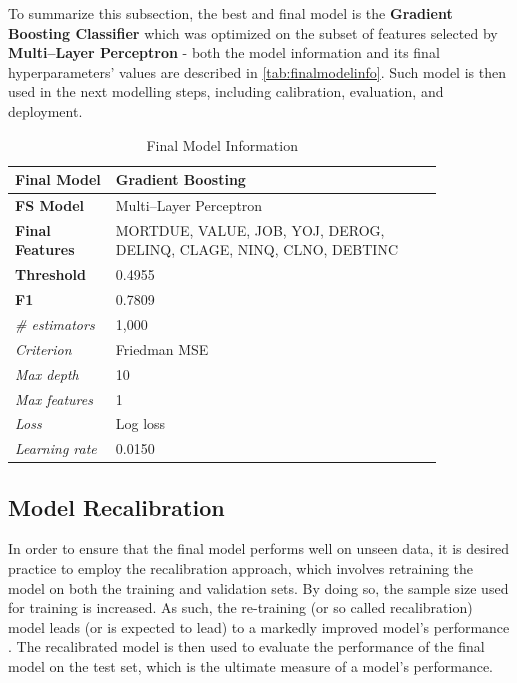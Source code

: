 \newpage
To summarize this subsection, the best and final model is the \textbf{Gradient Boosting Classifier} which was optimized on the subset of features selected by \textbf{Multi--Layer Perceptron} - both the model information and its final hyperparameters' values are described in \autoref{tab:finalmodelinfo}. Such model is then used in the next modelling steps, including calibration, evaluation, and deployment.
\begin{table}[H]
    \small
    \setlength{\tabcolsep}{8pt}
    \renewcommand{\arraystretch}{1.3}
    \centering
    \caption{Final Model Information}\label{tab:finalmodelinfo}
    \begin{tabular}{>{\raggedleft\arraybackslash}p{0.20\linewidth}|p{0.65\linewidth}}
    \toprule
    \midrule
    \textbf{Final Model} & Gradient Boosting \\
    \midrule
    \textbf{FS Model} & Multi--Layer Perceptron \\
    \midrule
    \textbf{Final Features} &
    MORTDUE, VALUE, JOB, YOJ, DEROG, DELINQ, CLAGE, NINQ, CLNO, DEBTINC \\
    \midrule
    \textbf{Threshold} & 0.4955 \\
    \midrule
    \textbf{F1} & 0.7809 \\
    \midrule
    \textit{\# estimators} & 1,000 \\
    \midrule
    \textit{Criterion} & Friedman MSE \\
    \midrule
    \textit{Max depth} & 10 \\
    \midrule
    \textit{Max features} & 1 \\
    \midrule
    \textit{Loss} & Log loss \\
    \midrule
    \textit{Learning rate} & 0.0150 \\
    \midrule
    \bottomrule
    \end{tabular}
    \vspace{0.5em}
    
    \vspace{-0.5em}
\end{table}

\newpage
\subsection{Model Recalibration}
\label{subsec:modelrecal}

In order to ensure that the final model performs well on unseen data, it is desired practice to employ the recalibration approach, which involves retraining the model on both the training and validation sets.
By doing so, the sample size used for training is increased. As such, the re-training (or so called recalibration) model leads (or is expected to lead) to a markedly improved model's performance \citep{de2023predicting}.
The recalibrated model is then used to evaluate the performance of the final model on the test set, which is the ultimate measure of a model's performance.

